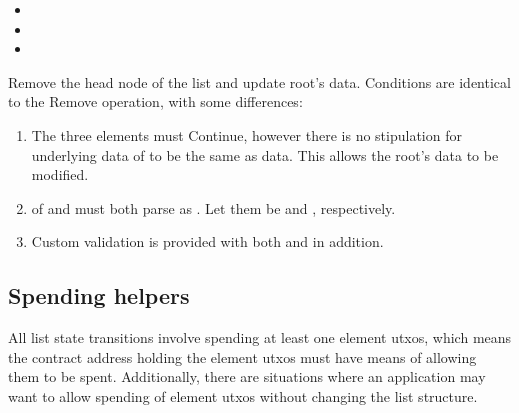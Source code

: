 \documentclass[../midgard.tex]{subfiles}
\begin{document}
\begin{description}
\begin{enumerate}
\begin{itemize}
\begin{enumerate}[resume]
\begin{itemize}
                    \item {}
                    \item {}
                    \item {}
                  \end{itemize}
              \end{enumerate}
          \end{itemize}
      \end{enumerate}
    \item[Fold from root.] Remove the head node of the list and update root's data.
      Conditions are identical to the Remove operation, with some differences:
      \begin{enumerate}
        \item The three elements must Continue, however there is no stipulation for underlying data of  to be the same as  data.
          This allows the root's data to be modified.
        \item {} of  and  must both parse as .
          Let them be  and , respectively.
        \item Custom validation is provided with both  and  in addition.
      \end{enumerate}
\end{description}

\subsection{Spending helpers}
\label{h:list-spending-helpers}

All list state transitions involve spending at least one element utxos, which means the contract address holding the element utxos must have means of allowing them to be spent.
Additionally, there are situations where an application may want to allow spending of element utxos without changing the list structure.
\end{document}
